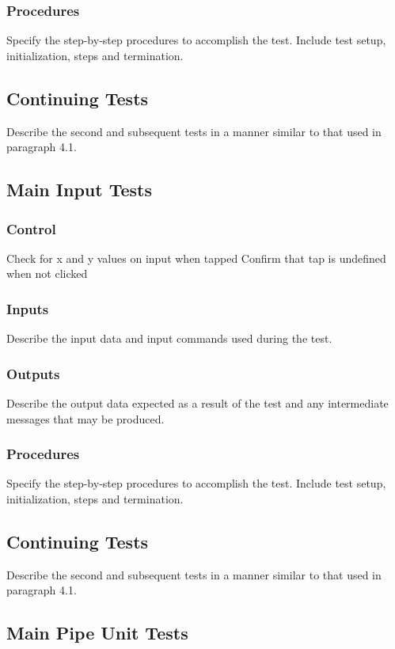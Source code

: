 \documentclass[11pt, oneside]{article}   	%
\begin{document}
\subsubsection{Procedures}
Specify the step-by-step procedures to accomplish the test. Include test setup, initialization, steps and termination.

\subsection{Continuing Tests}
Describe the second and subsequent tests in a manner similar to that used in paragraph 4.1.

\subsection{Main Input Tests}
\subsubsection{Control}
Check for x and y values on input when tapped
Confirm that tap is undefined when not clicked

\subsubsection{Inputs}
Describe the input data and input commands used during the test.

\subsubsection{Outputs}
Describe the output data expected as a result of the test and any intermediate messages that may be produced.

\subsubsection{Procedures}
Specify the step-by-step procedures to accomplish the test. Include test setup, initialization, steps and termination.

\subsection{Continuing Tests}
Describe the second and subsequent tests in a manner similar to that used in paragraph 4.1.

\subsection{Main Pipe Unit Tests}
\end{document}
